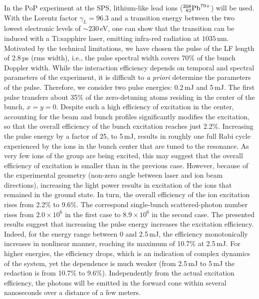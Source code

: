 In the PoP experiment at the SPS, lithium-like lead ions ($^{208}_{\phantom{0}82}{\rm Pb}^{79+}$) will be used.  With the Lorentz factor $\gamma_L=96.3$ and a transition energy between the two lowest electronic levels of $\sim230\,$eV, one can show that the transition can be induced with a Ti:sapphire laser, emitting infra-red radiation at $1035\,$nm.  Motivated by the technical limitations, we have chosen the pulse of the LF length of 2.8\,ps (rms width), i.e., the pulse spectral width covers 70\% of the bunch Doppler width.  While the interaction efficiency depends on temporal and spectral parameters of the experiment, it is difficult to {\em a priori} determine the parameters of the pulse.  Therefore, we consider two pulse energies: 0.2\,mJ and 5\,mJ.  The first pulse transfers about 35\% of the zero-detuning atoms residing in the center of the bunch, $x=y=0$.  Despite such a high efficiency of excitation in the center, accounting for the beam and bunch profiles significantly modifies the excitation, so that the overall efficiency of the bunch excitation reaches just 2.2\%.  Increasing the pulse energy by a factor of 25, to 5\,mJ, results in roughly one full Rabi cycle experienced by the ions in the bunch center that are tuned to the resonance.  As very few ions of the group are being excited, this may suggest that the overall efficiency of excitation is smaller than in the previous case.  However, because of the experimental geometry (non-zero angle between laser and ion beam directions), increasing the light power results in excitation of the ions that remained in the ground state. In turn, the overall efficiency of the ion excitation rises from 2.2\% to 9.6\%.  The correspond single-bunch scattered-photon number rises from $2.0\times 10^6$ in the first case to $8.9\times 10^6$ in the second case.  The presented results suggest that increasing the pulse energy increases the excitation efficiency.  Indeed, for the energy range between 0 and 2.5\,mJ, the efficiency monotonically increases in nonlinear manner, reaching its maximum of 10.7\% at 2.5\,mJ.  For higher energies, the efficiency drops, which is an indication of complex dynamics of the system, yet the dependence is much weaker (from 2.5\,mJ to 5\,mJ the redaction is from 10.7\% to 9.6\%).  Independently from the actual excitation efficiency, the photons will be emitted in the forward cone within several nanoseconds over a distance of a few meters.

